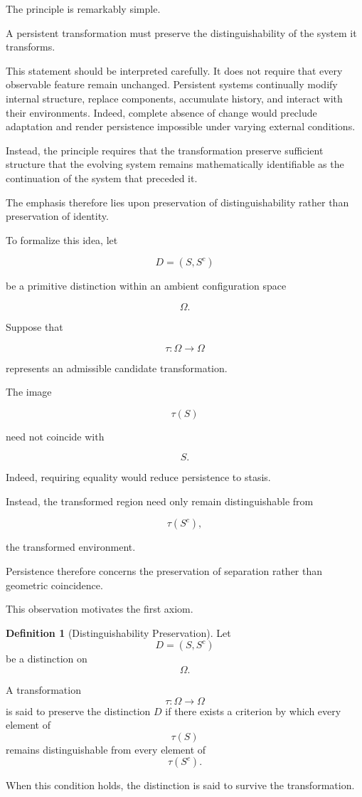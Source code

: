 \documentclass[11pt]{book}
\numberwithin{equation}{chapter}
\theoremstyle{definition}
\newtheorem{definition}{Definition}[chapter]
\theoremstyle{plain}
\begin{document}
The principle is remarkably simple.

A persistent transformation must preserve the distinguishability of the system it transforms.

This statement should be interpreted carefully. It does not require that every observable feature remain unchanged. Persistent systems continually modify internal structure, replace components, accumulate history, and interact with their environments. Indeed, complete absence of change would preclude adaptation and render persistence impossible under varying external conditions.

Instead, the principle requires that the transformation preserve sufficient structure that the evolving system remains mathematically identifiable as the continuation of the system that preceded it.

The emphasis therefore lies upon preservation of distinguishability rather than preservation of identity.

To formalize this idea, let

\[
D=(S,S^{c})
\]

be a primitive distinction within an ambient configuration space

\[
\Omega.
\]

Suppose that

\[
\tau:\Omega\rightarrow\Omega
\]

represents an admissible candidate transformation.

The image

\[
\tau(S)
\]

need not coincide with

\[
S.
\]

Indeed, requiring equality would reduce persistence to stasis.

Instead, the transformed region need only remain distinguishable from

\[
\tau(S^{c}),
\]

the transformed environment.

Persistence therefore concerns the preservation of separation rather than geometric coincidence.

This observation motivates the first axiom.

\begin{definition}[Distinguishability Preservation]
Let
\[
D=(S,S^{c})
\]
be a distinction on
\[
\Omega.
\]

A transformation
\[
\tau:\Omega\rightarrow\Omega
\]
is said to preserve the distinction \(D\) if there exists a criterion by which every element of
\[
\tau(S)
\]
remains distinguishable from every element of
\[
\tau(S^{c}).
\]

When this condition holds, the distinction is said to survive the transformation.
\end{definition}
\end{document}
